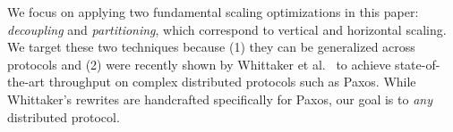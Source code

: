 We focus on applying two fundamental scaling optimizations in this paper: \emph{decoupling} and \emph{partitioning}, which correspond to vertical and horizontal scaling.
We target these two techniques because (1) they can be generalized across protocols and (2) were recently shown by Whittaker et al.~\cite{compartmentalized} to achieve state-of-the-art throughput on complex distributed protocols such as Paxos.
While Whittaker's rewrites are handcrafted specifically for Paxos, our goal is to  \emph{any} distributed protocol.



